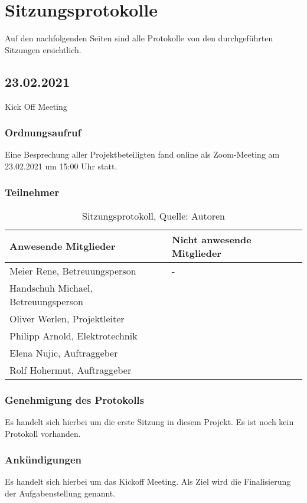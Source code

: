 \section{Sitzungsprotokolle}
Auf den nachfolgenden Seiten sind alle Protokolle von den durchgeführten Sitzungen ersichtlich.

\subsection{23.02.2021}\label{kickOff}
Kick Off Meeting
\subsubsection{Ordnungsaufruf}
Eine Besprechung aller Projektbeteiligten fand online als Zoom-Meeting am 23.02.2021 um 15:00 Uhr statt.
\subsubsection{Teilnehmer}
\begin{table}[H]
	\setlength\extrarowheight{2pt} %
	\begin{tabularx}{\textwidth}{|X|X|}
		\hline
		\textbf{Anwesende Mitglieder} &  \textbf{Nicht anwesende Mitglieder} \\
		\hline
		Meier Rene, Betreuungsperson &  -\\
		Handschuh Michael, Betreuungsperson &  \\
		Oliver Werlen, Projektleiter &  \\
		Philipp Arnold, Elektrotechnik & \\
		Elena Nujic, Auftraggeber & \\
		Rolf Hohermut, Auftraggeber &\\
		\hline
	\end{tabularx}
	\caption{ \label{tbl: Teilnehmerliste vom 23.02.2021}Sitzungsprotokoll, Quelle: Autoren}
\end{table}
\subsubsection{Genehmigung des Protokolls}
Es handelt sich hierbei um die erste Sitzung in diesem Projekt. Es ist noch kein Protokoll vorhanden. 
\subsubsection{Ankündigungen}
Es handelt sich hierbei um das Kickoff Meeting. Als Ziel wird die Finalisierung der Aufgabenstellung genannt. 
